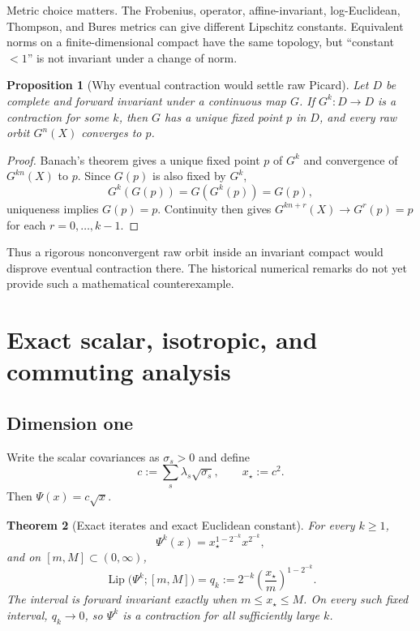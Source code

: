 \documentclass[11pt]{article}
\newtheorem{theorem}{Theorem}[section]
\newtheorem{proposition}[theorem]{Proposition}
\theoremstyle{definition}
\newcommand{\Lip}{\operatorname{Lip}}
\begin{document}
Metric choice matters.  The Frobenius, operator, affine-invariant,
log-Euclidean, Thompson, and Bures metrics can give different Lipschitz
constants.  Equivalent norms on a finite-dimensional compact have the same
topology, but ``constant $<1$'' is not invariant under a change of norm.

\begin{proposition}[Why eventual contraction would settle raw Picard]
Let $D$ be complete and forward invariant under a continuous map $G$.  If
$G^k:D\to D$ is a contraction for some $k$, then $G$ has a unique fixed point
$p$ in $D$, and every raw orbit $G^n(X)$ converges to $p$.
\end{proposition}

\begin{proof}
Banach's theorem gives a unique fixed point $p$ of $G^k$ and convergence of
$G^{kn}(X)$ to $p$.  Since $G(p)$ is also fixed by $G^k$,
\[
 G^k(G(p))=G(G^k(p))=G(p),
\]
uniqueness implies $G(p)=p$.  Continuity then gives
$G^{kn+r}(X)\to G^r(p)=p$ for each $r=0,\ldots,k-1$.
\end{proof}

Thus a rigorous nonconvergent raw orbit inside an invariant compact would
disprove eventual contraction there.  The historical numerical remarks do not
yet provide such a mathematical counterexample.

\section{Exact scalar, isotropic, and commuting analysis}

\subsection{Dimension one}

Write the scalar covariances as $\sigma_s>0$ and define
\begin{equation}\label{eq:scalar-c}
 c:=\sum_s\lambda_s\sqrt{\sigma_s},\qquad x_\star:=c^2.
\end{equation}
Then $\Psi(x)=c\sqrt{x}$.

\begin{theorem}[Exact iterates and exact Euclidean constant]\label{thm:scalar-exact}
For every $k\geq1$,
\begin{equation}\label{eq:scalar-iterate}
 \Psi^k(x)=x_\star^{1-2^{-k}}x^{2^{-k}},
\end{equation}
and on $[m,M]\subset(0,\infty)$,
\begin{equation}\label{eq:scalar-qk}
 \Lip\bigl(\Psi^k;[m,M]\bigr)
 =q_k:=2^{-k}
 \left(\frac{x_\star}{m}\right)^{1-2^{-k}}.
\end{equation}
The interval is forward invariant exactly when
$m\leq x_\star\leq M$.  On every such fixed interval, $q_k\to0$, so
$\Psi^k$ is a contraction for all sufficiently large $k$.
\end{theorem}
\end{document}
